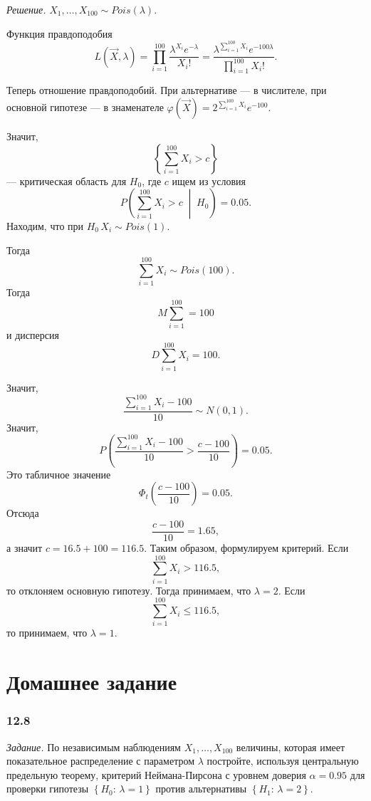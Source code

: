 \textit{Решение.} $X_1, \dotsc, X_{100} \sim Pois \left( \lambda \right) $.

Функция правдоподобия
$$L \left( \vec{X}, \lambda \right) =
  \prod \limits_{i = 1}^{100} \frac{ \lambda^{X_i} e^{- \lambda }}{X_i!} =
  \frac{ \lambda^{ \sum \limits_{i = 1}^{100} X_i} e^{-100 \lambda }}{ \prod \limits_{i = 1}^{100} X_i!}.$$

Теперь отношение правдоподобий.
При альтернативе --- в числителе, при основной гипотезе ---
в знаменателе $ \varphi \left( \vec{X} \right) = 2^{ \sum \limits_{i = 1}^{100} X_i} e^{-100}$.

Значит,
$$ \left\{ \sum \limits_{i = 1}^{100} X_i > c \right\} $$
--- критическая область для $H_0$, где $c$ ищем из условия
$$P \left( \sum \limits_{i = 1}^{100} X_i > c \; \middle| \; H_0 \right) =
  0.05.$$
Находим, что при $H_0 \, X_i \sim Pois \left( 1 \right) $.

Тогда
$$ \sum \limits_{i = 1}^{100} X_i \sim
  Pois \left( 100 \right).$$
Тогда
$$M \sum \limits_{i = 1}^{100} =
  100$$
и дисперсия
$$D \sum \limits_{i = 1}^{100} X_i =
  100.$$

Значит,
$$ \frac{ \sum \limits_{i = 1}^{100} X_i - 100}{10} \sim
  N \left( 0, 1 \right).$$
Значит,
$$P \left( \frac{ \sum \limits_{i = 1}^{100} X_i - 100}{10} > \frac{c - 100}{10} \right) =
  0.05.$$
Это табличное значение
$$ \Phi_t \left( \frac{c - 100}{10} \right) =
  0.05.$$
Отсюда
$$ \frac{c - 100}{10} =
  1.65,$$
а значит $c = 16.5 + 100 = 116.5$.
Таким образом, формулируем критерий.
Если
$$ \sum \limits_{i = 1}^{100} X_i >
  116.5,$$
то отклоняем основную гипотезу.
Тогда принимаем, что $ \lambda = 2$.
Если
$$ \sum \limits_{i = 1}^{100} X_i \leq
  116.5,$$
то принимаем, что $ \lambda = 1$.

\section*{Домашнее задание}

\subsubsection*{12.8}

\textit{Задание.}
По независимым наблюдениям $X_1, \dotsc, X_{100}$ величины,
которая имеет показательное распределение с параметром $ \lambda $ постройте,
используя центральную предельную теорему,
критерий Неймана-Пирсона с уровнем доверия $ \alpha = 0.95$ для проверки гипотезы
$ \left\{ H_0: \, \lambda = 1 \right\} $ против альтернативы
$ \left\{ H_1: \, \lambda = 2 \right\} $.

